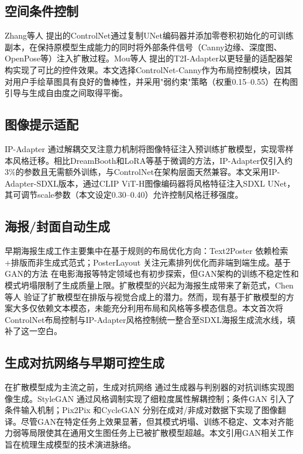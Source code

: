 \documentclass[12pt,a4paper]{ctexart}
\begin{document}
\subsection{空间条件控制}

Zhang等人\cite{zhang2023controlnet} 提出的ControlNet通过复制UNet编码器并添加零卷积初始化的可训练副本，在保持原模型生成能力的同时将外部条件信号（Canny边缘、深度图、OpenPose等）注入扩散过程。Mou等人\cite{mou2024t2i} 提出的T2I-Adapter以更轻量的适配器架构实现了可比的控件效果。本文选择ControlNet-Canny作为布局控制模块，因其对用户手绘草图具有良好的鲁棒性，并采用"弱约束"策略（权重0.15--0.55）在构图引导与生成自由度之间取得平衡。

\subsection{图像提示适配}

IP-Adapter\cite{ye2023ipadapter} 通过解耦交叉注意力机制将图像特征注入预训练扩散模型，实现零样本风格迁移。相比DreamBooth\cite{ruiz2023dreambooth}和LoRA\cite{hu2021lora}等基于微调的方法，IP-Adapter仅引入约3\%的参数且无需额外训练，与ControlNet在架构层面天然兼容。本文采用IP-Adapter-SDXL版本，通过CLIP ViT-H图像编码器将风格特征注入SDXL UNet，其可调节scale参数（本文设定0.30--0.40）允许控制风格迁移强度。

\subsection{海报/封面自动生成}

早期海报生成工作主要集中在基于规则的布局优化方向：Text2Poster\cite{jin2022text2poster} 依赖检索+排版而非生成式范式；PosterLayout\cite{hsu2023posterlayout} 关注元素排列优化而非端到端生成。基于GAN的方法\cite{karras2019stylegan} 在电影海报等特定领域也有初步探索，但GAN架构的训练不稳定性和模式坍塌限制了生成质量上限。扩散模型的兴起为海报生成带来了新范式，Chen等人\cite{chen2023textdiffuser} 验证了扩散模型在排版与视觉合成上的潜力。然而，现有基于扩散模型的方案大多仅依赖文本模态，未能充分利用布局和风格等多模态信息。本文首次将ControlNet布局控制与IP-Adapter风格控制统一整合至SDXL海报生成流水线，填补了这一空白。

\subsection{生成对抗网络与早期可控生成}

在扩散模型成为主流之前，生成对抗网络\cite{goodfellow2014gan} 通过生成器与判别器的对抗训练实现图像生成。StyleGAN\cite{karras2019stylegan} 通过风格调制实现了细粒度属性解耦控制；条件GAN\cite{mirza2014cgan} 引入了条件输入机制；Pix2Pix\cite{isola2017pix2pix} 和CycleGAN\cite{zhu2017cyclegan} 分别在成对/非成对数据下实现了图像翻译。尽管GAN在特定任务上效果显著，但其模式坍塌、训练不稳定、文本对齐能力弱等局限使其在通用文生图任务上已被扩散模型超越。本文引用GAN相关工作旨在梳理生成模型的技术演进脉络。
\end{document}
